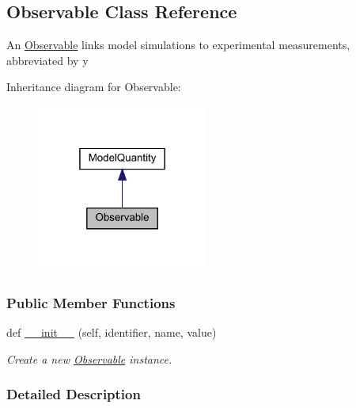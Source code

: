 \hypertarget{classamici_1_1ode__export_1_1_observable}{}\subsection{Observable Class Reference}
\label{classamici_1_1ode__export_1_1_observable}


An \mbox{\hyperlink{classamici_1_1ode__export_1_1_observable}{Observable}} links model simulations to experimental measurements, abbreviated by {\ttfamily y}  




Inheritance diagram for Observable\+:
\nopagebreak
\begin{figure}[H]
\begin{center}
\leavevmode
\includegraphics[width=160pt]{classamici_1_1ode__export_1_1_observable__inherit__graph}
\end{center}
\end{figure}
\subsubsection*{Public Member Functions}
\begin{DoxyCompactItemize}
\item 
def \mbox{\hyperlink{classamici_1_1ode__export_1_1_observable_a258843a3afab00b576ccf386e8673a64}{\+\_\+\+\_\+init\+\_\+\+\_\+}} (self, identifier, name, value)
\begin{DoxyCompactList}\small\item\em Create a new \mbox{\hyperlink{classamici_1_1ode__export_1_1_observable}{Observable}} instance. \end{DoxyCompactList}\end{DoxyCompactItemize}


\subsubsection{Detailed Description}


